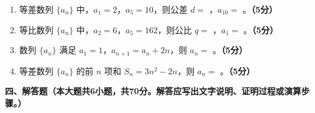 \documentclass[12pt, a4paper]{ctexart}
\newcommand{\score}[1]{\hfill\textbf{（#1分）}}
\begin{document}
\begin{enumerate}[resume]
\item 等差数列 $\{a_n\}$ 中，$a_1=2$，$a_5=10$，则公差 $d=$ \underline{\hspace{2cm}}，$a_{10}=$ \underline{\hspace{2cm}}。\score{5}

\item 等比数列 $\{a_n\}$ 中，$a_2=6$，$a_5=162$，则公比 $q=$ \underline{\hspace{2cm}}，$a_1=$ \underline{\hspace{2cm}}。\score{5}

\item 数列 $\{a_n\}$ 满足 $a_1=1$，$a_{n+1}=a_n+2n$，则 $a_n=$ \underline{\hspace{3cm}}。\score{5}

\item 等差数列 $\{a_n\}$ 的前 $n$ 项和 $S_n=3n^2-2n$，则 $a_n=$ \underline{\hspace{3cm}}。\score{5}
\end{enumerate}

\vspace{1em}

\noindent\textbf{四、解答题（本大题共6小题，共70分。解答应写出文字说明、证明过程或演算步骤。）}

\vspace{0.5em}
\end{document}
